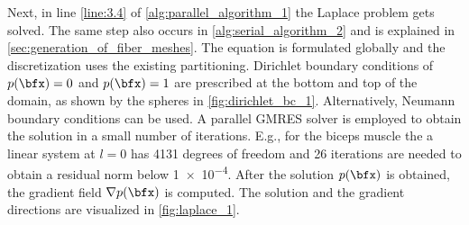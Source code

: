 Next, in line \ref{line:3.4} of \cref{alg:parallel_algorithm_1} the Laplace problem gets solved. The same step also occurs in \cref{alg:serial_algorithm_2} and is explained in \cref{sec:generation_of_fiber_meshes}.
The equation is formulated globally and the discretization uses the existing partitioning. 
Dirichlet boundary conditions of $p(\bfx) = 0$ and $p(\bfx) = 1$ are prescribed at the bottom and top of the domain, as shown by the spheres in \cref{fig:dirichlet_bc_1}. Alternatively, Neumann boundary conditions can be used.
A parallel GMRES solver is employed to obtain the solution in a small number of iterations. E.g., for the biceps muscle the a linear system at $l=0$ has 4131 degrees of freedom and 26 iterations are needed to obtain a residual norm below \num{1e-4}. After the solution $p(\bfx)$ is obtained, the gradient field $\nabla p(\bfx)$ is computed. The solution and the gradient directions are visualized in \cref{fig:laplace_1}.

